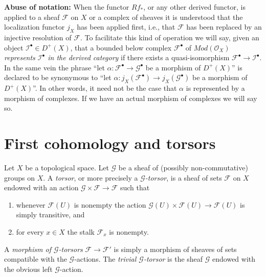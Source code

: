 \medskip\noindent
{\bf Abuse of notation:} When the functor $Rf_*$, or any other
derived functor, is applied to a sheaf $\mathcal{F}$ on $X$ or a complex
of sheaves it is understood that the localization functor $j_X$ has
been applied first, i.e., that $\mathcal{F}$ has been replaced by an
injective resolution of $\mathcal{F}$. To facilitate this kind of
operation we will say, given an object $\mathcal{I}^\bullet \in D^{+}(X)$,
that a bounded below complex $\mathcal{F}^\bullet$ of
$\textit{Mod}(\mathcal{O}_X)$
{\it represents $\mathcal{I}^\bullet$ in the derived category}
if there exists a quasi-isomorphism
$\mathcal{F}^\bullet \to \mathcal{I}^\bullet$. In the same vein the phrase
``let $\alpha : \mathcal{F}^\bullet \to \mathcal{G}^\bullet$ be
a morphism of $D^{+}(X)$'' is declared to be synonymous to
``let $\alpha : j_X(\mathcal{F}^\bullet) \to j_X(\mathcal{G}^\bullet)$
be a morphism of $D^{+}(X)$''. In other words, it need not be the
case that $\alpha$ is represented by a morphism of complexes. If we have
an actual morphism of complexes we will say so.









\section{First cohomology and torsors}
\label{section-h1-torsors}

\begin{definition}
\label{definition-torsor}
Let $X$ be a topological space.
Let $\mathcal{G}$ be a sheaf of (possibly non-commutative) groups on $X$.
A {\it torsor}, or more precisely a {\it $\mathcal{G}$-torsor}, is a sheaf
of sets $\mathcal{F}$ on $X$ endowed with an action
$\mathcal{G} \times \mathcal{F} \to \mathcal{F}$ such that
\begin{enumerate}
\item whenever $\mathcal{F}(U)$ is nonempty the action
$\mathcal{G}(U) \times \mathcal{F}(U) \to \mathcal{F}(U)$
is simply transitive, and
\item for every $x \in X$ the stalk $\mathcal{F}_x$ is nonempty.
\end{enumerate}
A {\it morphism of $\mathcal{G}$-torsors} $\mathcal{F} \to \mathcal{F}'$
is simply a morphism of sheaves of sets compatible with the
$\mathcal{G}$-actions. The {\it trivial $\mathcal{G}$-torsor}
is the sheaf $\mathcal{G}$ endowed with the obvious left
$\mathcal{G}$-action.
\end{definition}

